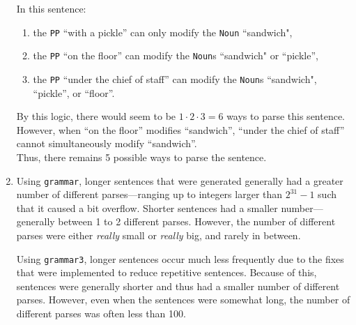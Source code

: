 \documentclass[11pt]{article}
\newcommand{\code}[1]{\texttt{#1}}
\begin{document}
\begin{enumerate}
	In this sentence:
	\begin{enumerate}[label=(\roman*)]
	\item the \code{PP} ``with a pickle'' can only modify the \code{Noun} ``sandwich",
	\item the \code{PP} ``on the floor'' can modify the \code{Noun}s ``sandwich" or ``pickle'',
	\item the \code{PP} ``under the chief of staff'' can modify the \code{Noun}s ``sandwich", ``pickle'', or ``floor''.
	\end{enumerate}
	By this logic, there would seem to be $1 \cdot 2 \cdot 3 = 6$ ways to parse this sentence. \vspace{4pt} \\
	However, when ``on the floor'' modifies ``sandwich'', ``under the chief of staff'' cannot simultaneously modify ``sandwich''. \vspace{4pt} \\
	Thus, there remains 5 possible ways to parse the sentence.
\item
	Using \code{grammar}, longer sentences that were generated generally had a greater number of different parses---ranging up to integers larger than $2^{31}-1$ such that it caused a bit overflow. Shorter sentences had a smaller number---generally between 1 to 2 different parses. However, the number of different parses were either \textit{really} small or \textit{really} big, and rarely in between.
	
	Using \code{grammar3}, longer sentences occur much less frequently due to the fixes that were implemented to reduce repetitive sentences. Because of this, sentences were generally shorter and thus had a smaller number of different parses. However, even when the sentences were somewhat long, the number of different parses was often less than 100. 
	

\end{enumerate}
\end{document}
